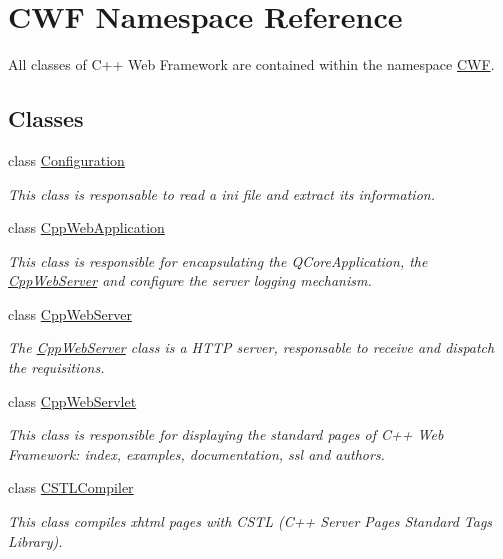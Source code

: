 \hypertarget{namespace_c_w_f}{\section{C\+W\+F Namespace Reference}
\label{namespace_c_w_f}
}


All classes of C++ Web Framework are contained within the namespace \hyperlink{namespace_c_w_f}{C\+W\+F}.  


\subsection*{Classes}
\begin{DoxyCompactItemize}
\item 
class \hyperlink{class_c_w_f_1_1_configuration}{Configuration}
\begin{DoxyCompactList}\small\item\em This class is responsable to read a ini file and extract its information. \end{DoxyCompactList}\item 
class \hyperlink{class_c_w_f_1_1_cpp_web_application}{Cpp\+Web\+Application}
\begin{DoxyCompactList}\small\item\em This class is responsible for encapsulating the Q\+Core\+Application, the \hyperlink{class_c_w_f_1_1_cpp_web_server}{Cpp\+Web\+Server} and configure the server logging mechanism. \end{DoxyCompactList}\item 
class \hyperlink{class_c_w_f_1_1_cpp_web_server}{Cpp\+Web\+Server}
\begin{DoxyCompactList}\small\item\em The \hyperlink{class_c_w_f_1_1_cpp_web_server}{Cpp\+Web\+Server} class is a H\+T\+T\+P server, responsable to receive and dispatch the requisitions. \end{DoxyCompactList}\item 
class \hyperlink{class_c_w_f_1_1_cpp_web_servlet}{Cpp\+Web\+Servlet}
\begin{DoxyCompactList}\small\item\em This class is responsible for displaying the standard pages of C++ Web Framework\+: index, examples, documentation, ssl and authors. \end{DoxyCompactList}\item 
class \hyperlink{class_c_w_f_1_1_c_s_t_l_compiler}{C\+S\+T\+L\+Compiler}
\begin{DoxyCompactList}\small\item\em This class compiles xhtml pages with C\+S\+T\+L (C++ Server Pages Standard Tags Library). \end{DoxyCompactList}\item 

\end{DoxyCompactItemize}
